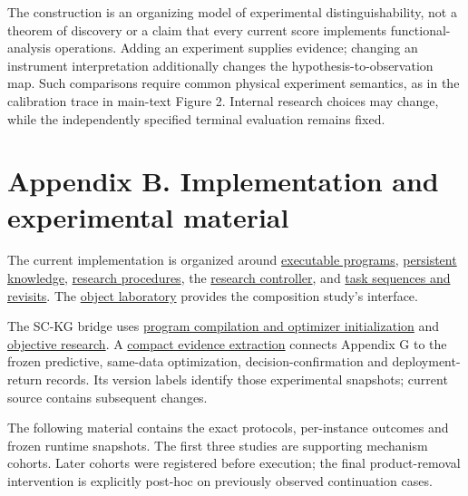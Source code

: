 \documentclass[twoside,11pt]{article}
\begin{document}
The construction is an organizing model of experimental distinguishability, not a theorem of discovery or a claim that every current score implements functional-analysis operations. Adding an experiment supplies evidence; changing an instrument interpretation additionally changes the hypothesis-to-observation map. Such comparisons require common physical experiment semantics, as in the calibration trace in main-text Figure 2. Internal research choices may change, while the independently specified terminal evaluation remains fixed.


\section*{Appendix B. Implementation and experimental material}

The current implementation is organized around \hyperlink{artifact-2}{executable programs}, \hyperlink{artifact-3}{persistent knowledge}, \hyperlink{artifact-4}{research procedures}, the \hyperlink{artifact-5}{research controller}, and \hyperlink{artifact-6}{task sequences and revisits}. The \hyperlink{artifact-7}{object laboratory} provides the composition study's interface.


The SC-KG bridge uses \hyperlink{artifact-8}{program compilation and optimizer initialization}
and \hyperlink{artifact-9}{objective research}.
A \hyperlink{artifact-10}{compact evidence extraction}
connects Appendix G to the frozen predictive, same-data optimization,
decision-confirmation and deployment-return records. Its version labels identify those experimental
snapshots; current source contains subsequent changes.


The following material contains the exact protocols, per-instance outcomes and
frozen runtime snapshots. The first three studies are supporting mechanism
cohorts. Later cohorts were registered before execution; the final product-removal
intervention is explicitly post-hoc on previously observed continuation cases.
\end{document}
